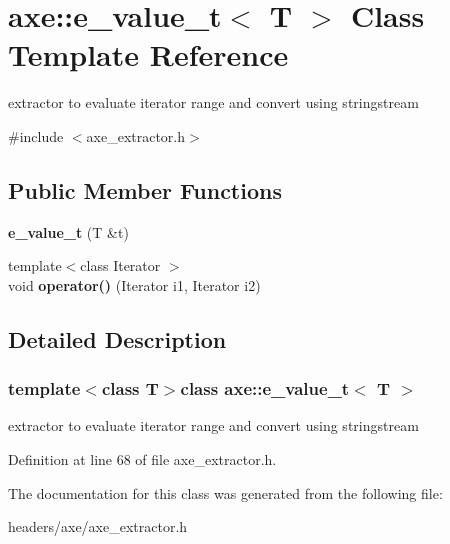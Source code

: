 \hypertarget{classaxe_1_1e__value__t}{\section{axe\+:\+:e\+\_\+value\+\_\+t$<$ T $>$ Class Template Reference}
\label{classaxe_1_1e__value__t}
}


extractor to evaluate iterator range and convert using stringstream  




{\ttfamily \#include $<$axe\+\_\+extractor.\+h$>$}

\subsection*{Public Member Functions}
\begin{DoxyCompactItemize}
\item 
\hypertarget{classaxe_1_1e__value__t_a654b7e683228c710bb2f98fcfced6d37}{{\bfseries e\+\_\+value\+\_\+t} (T \&t)}\label{classaxe_1_1e__value__t_a654b7e683228c710bb2f98fcfced6d37}

\item 
\hypertarget{classaxe_1_1e__value__t_a242e70fa58313bb34e354ff12ee62f50}{{\footnotesize template$<$class Iterator $>$ }\\void {\bfseries operator()} (Iterator i1, Iterator i2)}\label{classaxe_1_1e__value__t_a242e70fa58313bb34e354ff12ee62f50}

\end{DoxyCompactItemize}


\subsection{Detailed Description}
\subsubsection*{template$<$class T$>$class axe\+::e\+\_\+value\+\_\+t$<$ T $>$}

extractor to evaluate iterator range and convert using stringstream 

Definition at line 68 of file axe\+\_\+extractor.\+h.



The documentation for this class was generated from the following file\+:\begin{DoxyCompactItemize}
\item 
headers/axe/axe\+\_\+extractor.\+h\end{DoxyCompactItemize}
